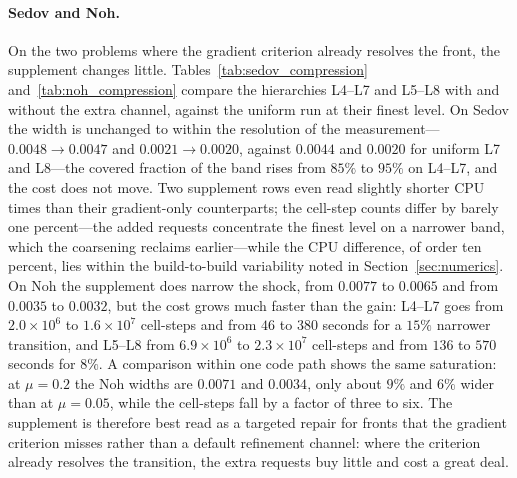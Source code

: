 \documentclass[a4paper]{cas-sc}
\begin{document}
\paragraph{Sedov and Noh.}
On the two problems where the gradient criterion already resolves the front,
the supplement changes little.
Tables~\ref{tab:sedov_compression} and~\ref{tab:noh_compression} compare the
hierarchies L4--L7 and L5--L8 with and without the extra channel, against the
uniform run at their finest level. On Sedov the width is unchanged to within
the resolution of the measurement---$0.0048\to0.0047$ and $0.0021\to0.0020$,
against $0.0044$ and $0.0020$ for uniform L7 and L8---the covered fraction of
the band rises from $85\%$ to $95\%$ on L4--L7, and the cost does not move.
Two supplement rows even read slightly shorter CPU times than their
gradient-only counterparts; the cell-step counts differ by barely one
percent---the added requests concentrate the finest level on a narrower band,
which the coarsening reclaims earlier---while the CPU difference, of order ten
percent, lies within the build-to-build variability noted in
Section~\ref{sec:numerics}. On
Noh the supplement does narrow the shock, from $0.0077$ to $0.0065$ and from
$0.0035$ to $0.0032$, but the cost grows much faster than the gain: L4--L7
goes from $2.0\times10^{6}$ to $1.6\times10^{7}$ cell-steps and from $46$ to
$380$ seconds for a $15\%$ narrower transition, and L5--L8 from
$6.9\times10^{6}$ to $2.3\times10^{7}$ cell-steps and from $136$ to $570$
seconds for $8\%$. A comparison within one code path shows the same
saturation: at $\mu=0.2$ the Noh widths are $0.0071$ and $0.0034$, only about
$9\%$ and $6\%$ wider than at $\mu=0.05$, while the cell-steps fall by a factor of three
to six. The supplement is therefore best read as a targeted repair for fronts
that the gradient criterion misses rather than a default refinement channel:
where the criterion already resolves the transition, the extra requests buy
little and cost a great deal.
\end{document}
